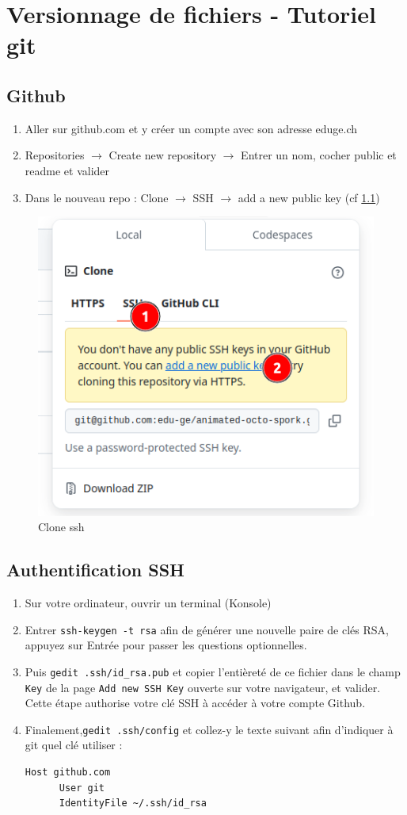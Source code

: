 \documentclass[11pt, a4paper]{book}
\begin{document}
\setcounter{chapter}{0}
\chapter{Versionnage de fichiers - Tutoriel git}

\section{Github}
\begin{enumerate}
    \item Aller sur github.com et y créer un compte avec son adresse eduge.ch
    \item  Repositories $\rightarrow$ Create new repository $\rightarrow$ Entrer un nom, cocher public et readme et valider
    \item Dans le nouveau repo : Clone $\rightarrow$ SSH $\rightarrow$ add a new public key (cf \ref{ssh})
\end{enumerate}

\begin{figure}[h!]
\centering
    \includegraphics[width=0.5\linewidth]{ssh.png}
    \caption{Clone ssh}
    \label{ssh}
\end{figure}

\section{Authentification SSH}

\begin{enumerate}
    \item Sur votre ordinateur, ouvrir un terminal (Konsole)
    \item Entrer \texttt{ssh-keygen -t rsa} afin de générer une nouvelle paire de clés RSA, appuyez sur Entrée pour passer les questions optionnelles.
    
    \item Puis \texttt{gedit .ssh/id\_rsa.pub} et copier l'entièreté de ce fichier dans le champ \texttt{Key} de la page \texttt{Add new SSH Key} ouverte sur votre navigateur, et valider. Cette étape authorise votre clé SSH à accéder à votre compte Github.
    \item Finalement,\texttt{gedit .ssh/config} et collez-y le texte suivant afin d'indiquer à git quel clé utiliser : \begin{lstlisting}[numbers=none]
  Host github.com
      User git
      IdentityFile ~/.ssh/id_rsa
\end{lstlisting}
\end{enumerate}
\end{document}
